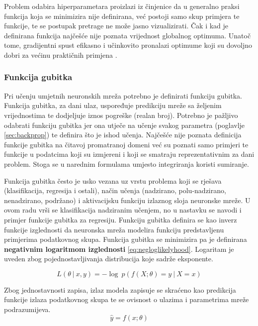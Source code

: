\documentclass[times, utf8, numeric, diplomski]{fer}
\def\probsep{\ |\ }
\def\secref#1{(poglavlje \ref{#1})}
\begin{document}
Problem odabira hiperparametara proizlazi iz činjenice da u generalno praksi funkcija koja se minimizira nije definirana, već postoji samo skup primjera te funkcije, te se postupak pretrage ne može jasno vizualizirati. Čak i kad je definirana funkcija najčešće nije poznata vrijednost globalnog optimuma. Unatoč tome, gradijentni spust efikasno i učinkovito pronalazi optimume koji su dovoljno dobri za većinu praktičnih primjena \citep{alexnet, yolo}.

\subsubsection{Funkcija gubitka}
Pri učenju umjetnih neuronskih mreža potrebno je definirati funkciju gubitka. Funkcija gubitka, za dani ulaz, uspoređuje predikciju mreže sa željenim vrijednostima te dodjeljuje iznos pogreške (realan broj). Potrebno je pažljivo odabrati funkciju gubitka jer ona utječe na učenje svakog parametra \secref{sec:backprop} te definira što je ishod učenja. Najčešće nije poznata definicija funkcije gubitka na čitavoj promatranoj domeni već su poznati samo primjeri te funkcije u podatcima koji su izmjereni i koji se smatraju reprezentativnim za dani problem. Stoga se u narednim formulama umjesto integriranja koristi sumiranje.

Funkcija gubitka često je usko vezana uz vrstu problema koji se rješava (klasifikacija, regresija i ostali), način učenja (nadzirano, polu-nadzirano, nenadzirano, podržano) i aktivacijsku funkciju izlaznog sloja neuronske mreže. U ovom radu vrši se klasifikacija nadziranim učenjem, no u nastavku se navodi i primjer funkcije gubitka za regresiju. Funkciju gubitka definira se kao inverz funkcije izglednosti da neuronska mreža modelira funkciju predstavljenu primjerima podatkovnog skupa. Funkcija gubitka se minimizira pa je definirana \textbf{negativnim logaritmom izglednosti} \eqref{eq:negloglikelyhood}. Logaritam je uveden zbog pojednostavljivanja distribucija koje sadrže eksponente.

\begin{equation}
\label{eq:negloglikelyhood}
L(\theta \probsep x,y) = -\log\ p(f(X;\theta)=y \probsep X=x)
\end{equation}

Zbog jednostavnosti zapisa, izlaz modela zapisuje se skraćeno kao predikcija funkcije izlaza podatkovnog skupa te se ovisnost o ulazima i parametrima mreže podrazumijeva.
\begin{equation}
\hat{y} = f(x; \theta)
\end{equation}
\end{document}
